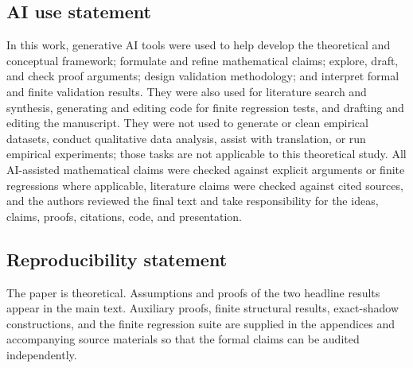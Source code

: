 \documentclass{article}
\begin{document}
\subsection*{AI use statement}
In this work, generative AI tools were used to help develop the theoretical and conceptual framework; formulate and refine mathematical claims; explore, draft, and check proof arguments; design validation methodology; and interpret formal and finite validation results. They were also used for literature search and synthesis, generating and editing code for finite regression tests, and drafting and editing the manuscript. They were not used to generate or clean empirical datasets, conduct qualitative data analysis, assist with translation, or run empirical experiments; those tasks are not applicable to this theoretical study. All AI-assisted mathematical claims were checked against explicit arguments or finite regressions where applicable, literature claims were checked against cited sources, and the authors reviewed the final text and take responsibility for the ideas, claims, proofs, citations, code, and presentation.

\subsection*{Reproducibility statement}
The paper is theoretical. Assumptions and proofs of the two headline results appear in the main text. Auxiliary proofs, finite structural results, exact-shadow constructions, and the finite regression suite are supplied in the appendices and accompanying source materials so that the formal claims can be audited independently.




\appendix





\end{document}
